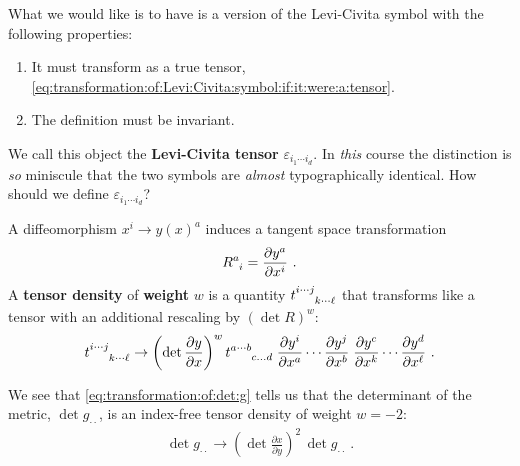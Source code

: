 \begin{subappendices}
What we would like is to have is a version of the Levi-Civita symbol with the following properties:
\begin{enumerate}
    \item It must transform as a true tensor, \eqref{eq:transformation:of:Levi:Civita:symbol:if:it:were:a:tensor}.
    \item The definition must be invariant.
\end{enumerate}
We call this object the \textbf{Levi-Civita tensor} $\varepsilon_{i_1\cdots i_d}$. 
% 
In \emph{this} course the distinction is \emph{so} miniscule that the two symbols are \emph{almost} typographically identical. How should we define $\varepsilon_{i_1\cdots i_d}$?

A diffeomorphism $x^i \to y(x)^a$ induces a tangent space transformation
\begin{align}
R\aij{a}{i} = \frac{\partial y^a}{\partial x^i}     \ .
\end{align}
A \textbf{tensor density} of \textbf{weight} $w$ is a quantity $t\aij{i\cdots j}{k\cdots \ell}$ that transforms like a tensor with an additional rescaling by $(\det R)^w$:
\begin{align}
    t\aij{i\cdots j}{k\cdots \ell} \to 
    \left(\det \frac{\partial y}{\partial x}\right)^w
    t\aij{a\cdots b}{c\dots d}
    \;
    \frac{\partial y^i}{\partial x^a}
    \cdots
    \frac{\partial y^j}{\partial x^b}\;
    \frac{\partial y^c}{\partial x^k}
    \cdots
    \frac{\partial y^d}{\partial x^\ell} \ .
\end{align}
\begin{example}
We see that \eqref{eq:transformation:of:det:g} tells us that the determinant of the metric,\sidenotemark{} $\det g_{\cdot\cdot}$, is an index-free tensor density of weight $w=-2$:
\begin{align}
    \det g_{\cdot\cdot} \to \left(\det \frac{\partial x}{\partial y}\right)^2\, \det g_{\cdot\cdot}
    \label{eq:det:g:tensor:density}
    \ .
\end{align}
\end{example}


\end{subappendices}
